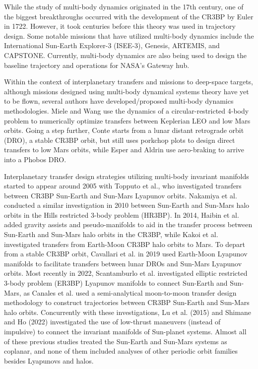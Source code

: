 While the study of multi-body dynamics originated in the 17th century, one of the biggest
breakthroughs occurred with the development of the CR3BP by Euler in 1722\cite{BarrowGreen:1997}.
However, it took centuries before this theory was used in trajectory design. Some notable missions
that have utilized multi-body dynamics include the International Sun-Earth Explorer-3
(ISEE-3)\cite{Farquhar:1984}, Genesis\cite{Lo:2001}, ARTEMIS\cite{Woodard:2009}, and
CAPSTONE\cite{Cheetham:2021}. Currently, multi-body dynamics are also being used to design the
baseline trajectory and operations for NASA's Gateway
hub\cite{Zamora:2024,Boudad:2022,ZimovanSpreen:2022}.

Within the context of interplanetary transfers and missions to deep-space targets, although
missions designed using multi-body dynamical systems theory have yet to be flown, several authors
have developed/proposed multi-body dynamics methodologies. Miele and Wang use the dynamics of a
circular-restricted 4-body problem to numerically optimize transfers between Keplerian LEO and low
Mars orbits\cite{Miele:1999}. Going a step further, Conte starts from a lunar distant retrograde
orbit (DRO), a stable CR3BP orbit, but still uses porkchop plots to design direct transfers to low
Mars orbits\cite{Conte:2017}, while Esper and Aldrin use aero-braking to arrive into a Phobos
DRO\cite{Esper:2019}.

Interplanetary transfer design strategies utilizing multi-body invariant manifolds started to
appear around 2005 with Topputo et al., who investigated transfers between CR3BP Sun-Earth and
Sun-Mars Lyapunov orbits\cite{Topputo:2005}. Nakamiya et al. conducted a similar investigation in
2010 between Sun-Earth and Sun-Mars halo orbits in the Hills restricted 3-body problem
(HR3BP)\cite{Nakamiya:2010}. In 2014, Haibin et al. added gravity assists and pseudo-manifolds to
aid in the transfer process between Sun-Earth and Sun-Mars halo orbits in the
CR3BP\cite{Haibin:2014}, while Kakoi et al. investigated transfers from Earth-Moon CR3BP halo
orbits to Mars\cite{Kakoi:2014}. To depart from a stable CR3BP orbit, Cavallari et al. in 2019 used
Earth-Moon Lyapunov manifolds to facilitate transfers between lunar DROs and Sun-Mars Lyapunov
orbits\cite{Cavallari:2019}. Most recently in 2022, Scantamburlo et al. investigated elliptic
restricted 3-body problem (ER3BP) Lyapunov manifolds to connect Sun-Earth and
Sun-Mars\cite{Scantamburlo:2022}, as Canales et al. used a semi-analytical moon-to-moon transfer
design methodology to construct trajectories between CR3BP Sun-Earth and Sun-Mars halo
orbits\cite{Canales:2022}. Concurrently with these investigations, Lu et al. (2015) and Shimane and
Ho (2022) investigated the use of low-thrust maneuvers (instead of impulsive) to connect the
invariant manifolds of Sun-planet systems\cite{Lu:2015,Shimane:2022}. Almost all of these previous
studies treated the Sun-Earth and Sun-Mars systems as coplanar, and none of them included analyses
of other periodic orbit families besides Lyapunovs and halos.

